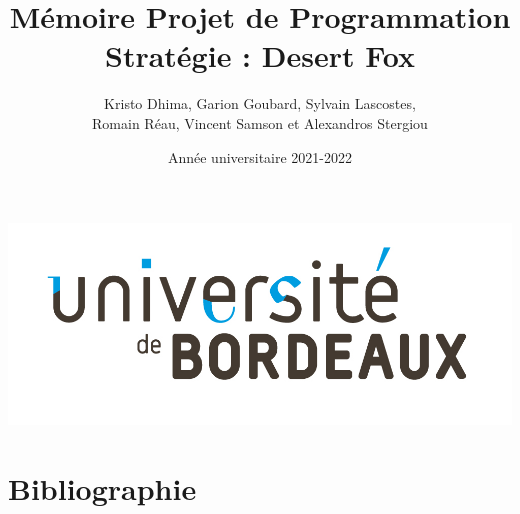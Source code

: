 \documentclass{article}[a4paper, 12pt]
\title{\LARGE \textbf{Mémoire Projet de Programmation  } \\ \Large \textbf{Stratégie : Desert Fox}}
\author{Kristo Dhima, Garion Goubard, Sylvain Lascostes, \\Romain Réau, Vincent Samson et Alexandros Stergiou }
\date{Année universitaire 2021-2022}
\begin{document}
\maketitle
\begin{center}
\center 
\includegraphics[scale=0.2]{data/Universite_Bordeaux_RVB-10.jpg}

\end{center}





\newpage
\tableofcontents %


\newpage



\newpage


\newpage







\section{Bibliographie}




%
\end{document}
